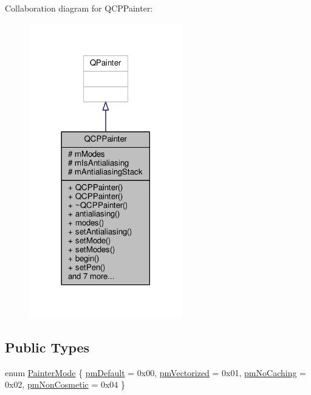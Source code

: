Collaboration diagram for Q\+C\+P\+Painter\+:\nopagebreak
\begin{figure}[H]
\begin{center}
\leavevmode
\includegraphics[width=189pt]{class_q_c_p_painter__coll__graph}
\end{center}
\end{figure}
\subsection*{Public Types}
\begin{DoxyCompactItemize}
\item 
enum \hyperlink{class_q_c_p_painter_a156cf16444ff5e0d81a73c615fdb156d}{Painter\+Mode} \{ \hyperlink{class_q_c_p_painter_a156cf16444ff5e0d81a73c615fdb156da3bac5e87e3d58553b297befb4eee2a45}{pm\+Default} = 0x00, 
\hyperlink{class_q_c_p_painter_a156cf16444ff5e0d81a73c615fdb156daeda679cd55dcd468341d07d48a30b6ab}{pm\+Vectorized} = 0x01, 
\hyperlink{class_q_c_p_painter_a156cf16444ff5e0d81a73c615fdb156dae78f9a4eb277a5f9207f50850a51a0b0}{pm\+No\+Caching} = 0x02, 
\hyperlink{class_q_c_p_painter_a156cf16444ff5e0d81a73c615fdb156dac1e481bfaf408f2bd2eaad3ec341f36b}{pm\+Non\+Cosmetic} = 0x04
 \}
\end{DoxyCompactItemize}
